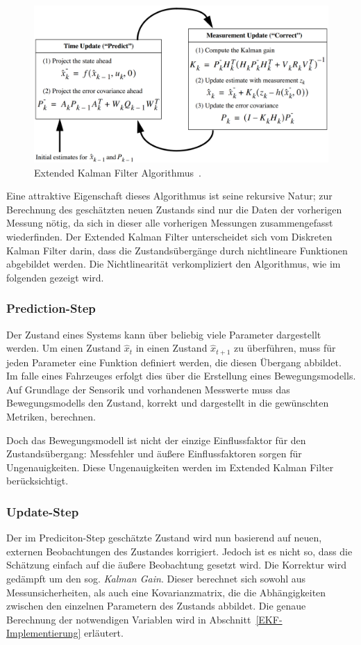 \documentclass[11pt]{article}
\begin{document}
\begin{figure}[!t]
	\centering
	\includegraphics[width=5in]{EKF_algorithm.png}
	\caption{Extended Kalman Filter Algorithmus~\cite{EKF_course}.}
	\label{EKF-Algorithmus}
\end{figure}

Eine attraktive Eigenschaft dieses Algorithmus ist seine rekursive Natur; zur Berechnung des geschätzten neuen Zustands sind nur die Daten der vorherigen Messung nötig, da sich  in dieser alle vorherigen Messungen zusammengefasst wiederfinden. Der Extended Kalman Filter unterscheidet sich vom Diskreten Kalman Filter darin, dass die Zustandsübergänge durch nichtlineare Funktionen abgebildet werden. Die Nichtlinearität verkompliziert den Algorithmus, wie im folgenden gezeigt wird.

\subsubsection{Prediction-Step}
Der Zustand eines Systems kann über beliebig viele Parameter dargestellt werden. Um einen Zustand $\hat{x}_t$ in einen Zustand $\hat{x}_{t+1}$ zu überführen, muss für jeden Parameter eine Funktion definiert werden, die diesen Übergang abbildet. Im falle eines Fahrzeuges erfolgt dies über die Erstellung eines Bewegungsmodells. Auf Grundlage der Sensorik und vorhandenen Messwerte muss das Bewegungsmodells den Zustand, korrekt und dargestellt in die gewünschten Metriken, berechnen.

Doch das Bewegungsmodell ist nicht der einzige Einflussfaktor für den Zustandsübergang: Messfehler und äußere Einflussfaktoren sorgen für Ungenauigkeiten. Diese Ungenauigkeiten werden im Extended Kalman Filter berücksichtigt.

\subsubsection{Update-Step}
Der im Prediciton-Step geschätzte Zustand wird nun basierend auf neuen, externen Beobachtungen des Zustandes korrigiert. Jedoch ist es nicht so, dass die Schätzung einfach auf die äußere Beobachtung gesetzt wird. Die Korrektur wird gedämpft um den sog. \textit{Kalman Gain}. Dieser berechnet sich sowohl aus Messunsicherheiten, als auch eine Kovarianzmatrix, die die Abhängigkeiten zwischen den einzelnen Parametern des Zustands abbildet. Die genaue Berechnung der notwendigen Variablen wird in Abschnitt~\ref{EKF-Implementierung} erläutert.
\end{document}
